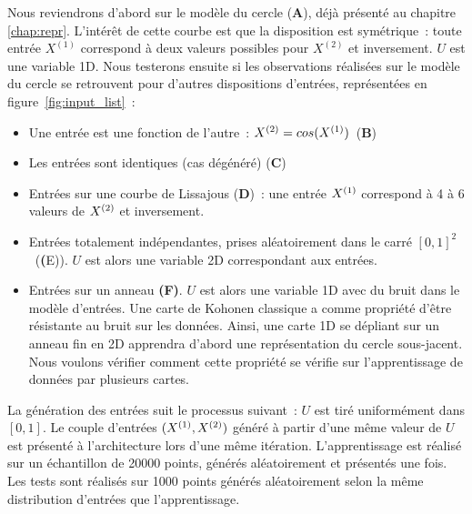 \documentclass[../main]{subfiles}
\begin{document}
Nous reviendrons d'abord sur le modèle du cercle (\textbf{A}), déjà présenté au chapitre \ref{chap:repr}. L'intérêt de cette courbe est que la disposition est symétrique~: toute entrée $X^{(1)}$ correspond à deux valeurs possibles pour $X^{(2)}$ et inversement. $U$ est une variable 1D.
Nous testerons ensuite si les observations réalisées sur le modèle du cercle se retrouvent pour d'autres dispositions d'entrées, représentées en figure~\ref{fig:input_list}~:
\begin{itemize}
	\item Une entrée est une fonction de l'autre~: $X^{({2})} = cos(X^{({1})})$~(\textbf{B})
	\item Les entrées sont identiques (cas dégénéré) (\textbf{C})
	\item Entrées sur une courbe de Lissajous (\textbf{D})~: une entrée $X^{({1})}$ correspond à 4 à 6 valeurs de $X^{({2})}$ et inversement.
	\item Entrées totalement indépendantes, prises aléatoirement dans le carré $[0,1]^2$~(\textbf({E})). $U$ est alors une variable 2D correspondant aux entrées.
	\item Entrées sur un anneau \textbf{(F)}. $U$ est alors une variable 1D avec du bruit dans le modèle d'entrées. Une carte de Kohonen classique a comme propriété d'être résistante au bruit sur les données. Ainsi, une carte 1D se dépliant sur un anneau fin en 2D apprendra d'abord une représentation du cercle sous-jacent. Nous voulons vérifier comment cette propriété se vérifie sur l'apprentissage de données par plusieurs cartes.
\end{itemize}

La génération des entrées suit le processus suivant~: $U$ est tiré uniformément dans $[0,1]$. Le couple d'entrées $(X^{({1})},X^{({2})})$ généré à partir d'une même valeur de $U$ est présenté à l'architecture lors d'une même itération.
L'apprentissage est réalisé sur un échantillon de 20000 points, générés aléatoirement et présentés une fois. 
Les tests sont réalisés sur 1000 points générés aléatoirement selon la même distribution d'entrées que l'apprentissage.



\end{document}
